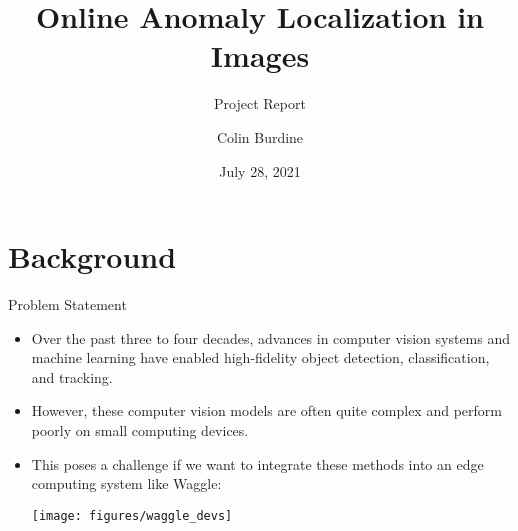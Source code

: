 \documentclass[10pt,handout]{beamer}
\title{Online Anomaly Localization in Images}
\subtitle{Project Report}
\date{July 28, 2021}
\author{Colin Burdine}
\institute{SULI Intern $|$ Argonne National Laboratory}
\begin{document}
\maketitle


\section{Background}


\begin{frame}{Problem Statement}

\begin{itemize}
\item Over the past three to four decades, advances in computer vision systems and machine learning have enabled high-fidelity object detection, classification, and tracking.

\item However, these computer vision models are often quite complex and perform poorly on small computing devices.

\pause 
\item This poses a challenge if we want to integrate these methods into an \alert{edge computing} system like Waggle:\\[4mm]
\begin{center}
\texttt{[image: figures/waggle\_devs]}
\end{center}

\end{itemize}
\end{frame}
\end{document}
